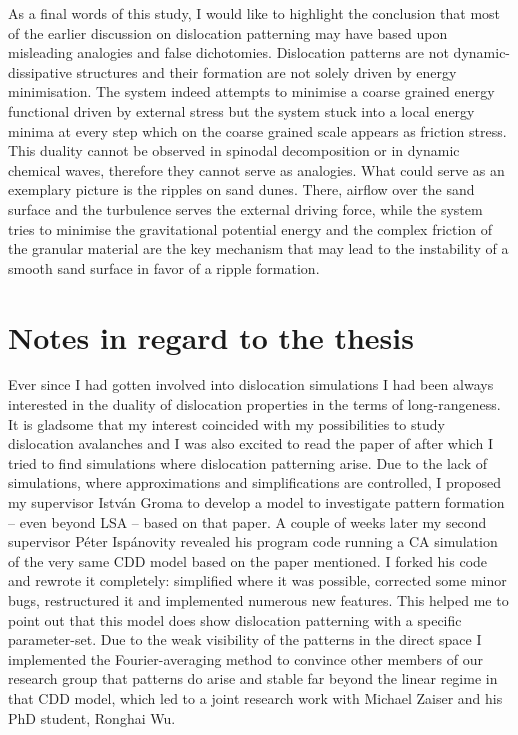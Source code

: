 As a final words of this study, I would like to highlight the conclusion that most of the earlier discussion on dislocation patterning may have based upon misleading analogies and false dichotomies. Dislocation patterns are not dynamic-dissipative structures and their formation are not solely driven by energy minimisation. The system indeed attempts to minimise a coarse grained energy functional driven by external stress but the system stuck into a local energy minima at every step which on the coarse grained scale appears as friction stress. This duality cannot be observed in spinodal decomposition or in dynamic chemical waves, therefore they cannot serve as analogies. What could serve as an exemplary picture is the ripples on sand dunes. There, airflow over the sand surface and the turbulence serves the external driving force, while the system tries to minimise the gravitational potential energy and the complex friction of the granular material are the key mechanism that may lead to the instability of a smooth sand surface in favor of a ripple formation\cite{kok2012physics}.

\section*{Notes in regard to the thesis}
Ever since I had gotten involved into dislocation simulations I had been always interested in the duality of dislocation properties in the terms of long-rangeness. It is gladsome that my interest coincided with my possibilities to study dislocation avalanches and I was also excited to read the paper of \citet{PhysRevB.93.214110} after which I tried to find simulations where dislocation patterning arise. Due to the lack of simulations, where approximations and simplifications are controlled, I proposed my supervisor István Groma to develop a model to investigate pattern formation -- even beyond LSA -- based on that paper. A couple of weeks later my second supervisor Péter Ispánovity revealed his program code running a CA simulation of the very same CDD model based on the paper mentioned. I forked his code and rewrote it completely: simplified where it was possible, corrected some minor bugs, restructured it and implemented numerous new features. This helped me to point out that this model does show dislocation patterning with a specific parameter-set. Due to the weak visibility of the patterns in the direct space I implemented the Fourier-averaging method to convince other members of our research group that patterns do arise and stable far beyond the linear regime in that CDD model, which led to a joint research work with Michael Zaiser and his PhD student, Ronghai Wu.

